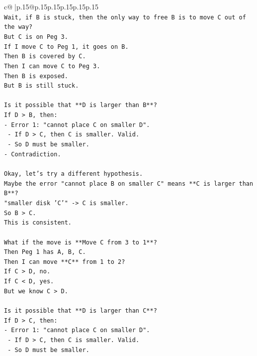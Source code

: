 \documentclass{article}
\begin{document}
{\begin{supertabular}{c@{$\;$}|p{.15\linewidth}@{}p{.15\linewidth}p{.15\linewidth}p{.15\linewidth}p{.15\linewidth}p{.15\linewidth}}
{{{\\ 
\texttt{Wait, if B is stuck, then the only way to free B is to move C out of the way?} \\
\texttt{But C is on Peg 3.} \\
\texttt{If I move C to Peg 1, it goes on B.} \\
\texttt{Then B is covered by C.} \\
\texttt{Then I can move C to Peg 3.} \\
\texttt{Then B is exposed.} \\
\texttt{But B is still stuck.} \\
\\ 
\texttt{Is it possible that **D is larger than B**?} \\
\texttt{If D > B, then:} \\
\texttt{{-} Error 1: "cannot place C on smaller D".} \\
\texttt{    {-} If D > C, then C is smaller. Valid.} \\
\texttt{    {-} So D must be smaller.} \\
\texttt{{-} Contradiction.} \\
\\ 
\texttt{Okay, let's try a different hypothesis.} \\
\texttt{Maybe the error "cannot place B on smaller C" means **C is larger than B**?} \\
\texttt{"smaller disk 'C'" {-}> C is smaller.} \\
\texttt{So B > C.} \\
\texttt{This is consistent.} \\
\\ 
\texttt{What if the move is **Move C from 3 to 1**?} \\
\texttt{Then Peg 1 has A, B, C.} \\
\texttt{Then I can move **C** from 1 to 2?} \\
\texttt{If C > D, no.} \\
\texttt{If C < D, yes.} \\
\texttt{But we know C > D.} \\
\\ 
\texttt{Is it possible that **D is larger than C**?} \\
\texttt{If D > C, then:} \\
\texttt{{-} Error 1: "cannot place C on smaller D".} \\
\texttt{    {-} If D > C, then C is smaller. Valid.} \\
\texttt{    {-} So D must be smaller.} \\
}}}
\end{supertabular}}
\end{document}
